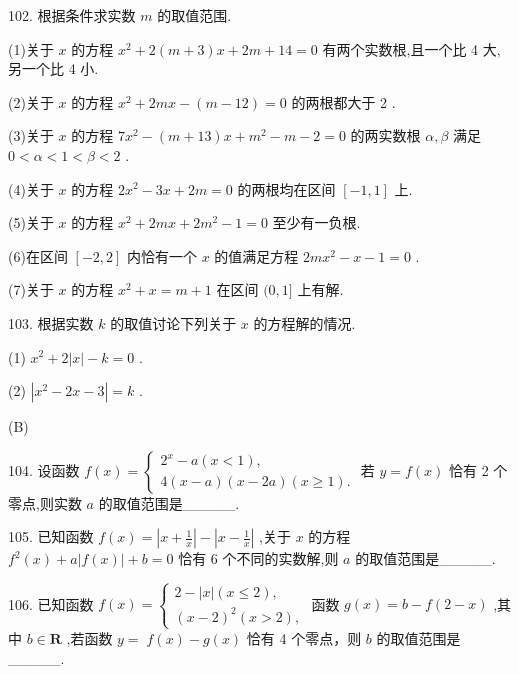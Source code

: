 \documentclass[10pt]{article}
\begin{document}
102. 根据条件求实数 \(m\) 的取值范围.

(1)关于 \(x\) 的方程 \({x}^{2} + 2\left( {m + 3}\right) x + {2m} + {14} = 0\) 有两个实数根,且一个比 4 大,另一个比 4 小.

(2)关于 \(x\) 的方程 \({x}^{2} + {2mx} - \left( {m - {12}}\right)  = 0\) 的两根都大于 2 .

(3)关于 \(x\) 的方程 \(7{x}^{2} - \left( {m + {13}}\right) x + {m}^{2} - m - 2 = 0\) 的两实数根 \(\alpha ,\beta\) 满足 \(0 < \alpha  < 1 < \beta  < 2\) .

(4)关于 \(x\) 的方程 \(2{x}^{2} - {3x} + {2m} = 0\) 的两根均在区间 \(\left\lbrack  {-1,1}\right\rbrack\) 上.

(5)关于 \(x\) 的方程 \({x}^{2} + {2mx} + {2{m}^{2}} - 1 = 0\) 至少有一负根.

(6)在区间 \(\left\lbrack  {-2,2}\right\rbrack\) 内恰有一个 \(x\) 的值满足方程 \({2m}{x}^{2} - x - 1 = 0\) .

(7)关于 \(x\) 的方程 \({x}^{2} + x = m + 1\) 在区间 \((0,1\rbrack\) 上有解.

103. 根据实数 \(k\) 的取值讨论下列关于 \(x\) 的方程解的情况.

(1) \({x}^{2} + 2\left| x\right|  - k = 0\) .

(2) \(\left| {{x}^{2} - {2x} - 3}\right|  = k\) .

(B)

104. 设函数 \(f\left( x\right)  = \left\{  \begin{array}{l} {2}^{x} - a\left( {x < 1}\right) , \\  4\left( {x - a}\right) \left( {x - {2a}}\right) \left( {x \geq  1}\right) . \end{array}\right.\) 若 \(y = f\left( x\right)\) 恰有 2 个零点,则实数 \(a\) 的取值范围是\_\_\_\_\_.

105. 已知函数 \(f\left( x\right)  = \left| {x + \frac{1}{x}}\right|  - \left| {x - \frac{1}{x}}\right|\) ,关于 \(x\) 的方程 \({f}^{2}\left( x\right)  + a\left| {f\left( x\right) }\right|  + b = 0\) 恰有 6 个不同的实数解,则 \(a\) 的取值范围是\_\_\_\_\_.

106. 已知函数 \(f\left( x\right)  = \left\{  \begin{array}{l} 2 - \left| x\right| \left( {x \leq  2}\right) , \\  {\left( x - 2\right) }^{2}\left( {x > 2}\right) , \end{array}\right.\) 函数 \(g\left( x\right)  = b - f\left( {2 - x}\right)\) ,其中 \(b \in  \mathbf{R}\) ,若函数 \(y = \; f\left( x\right)  - g\left( x\right)\) 恰有 4 个零点，则 \(b\) 的取值范围是\_\_\_\_\_.
\end{document}

